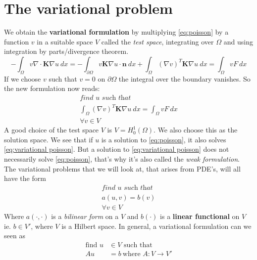 \documentclass[../Main/main.tex]{subfiles}
\begin{document}
	\section*{The variational problem}
	We obtain the \textbf{variational formulation} by multiplying \eqref{eq:poisson} by a function $v$ in a suitable space $V$ called the \emph{test space}, integrating over $\Omega$ and using integration by parts/divergence theorem.
	\begin{equation*}
		-\int_{\Omega}v\nabla \cdot\pmb{K}\nabla u \ dx = -\int_{\partial \Omega}v \pmb{K}\nabla u \cdot \pmb{n} \ dx + \int_{\Omega}(\nabla v)^{T}\pmb{K} \nabla u \ dx = \int_{\Omega}v F \ dx
	\end{equation*}
	If we choose $v$ such that $v=0$ on $\partial \Omega$ the integral over the boundary vanishes. So the new formulation now reads:
	\begin{equation}\label{eq:variational poisson}
		\begin{gathered}
			\textit{find }u \textit{ such that} 						\\ 
			 \int_{\Omega}(\nabla v)^T \pmb{K} \nabla u \ dx = \int_{\Omega}v F \ dx\\ 
			\forall v \in V
		\end{gathered}
	\end{equation}
	A good choice of the test space $V$ is $V=H_0^1(\Omega)$. We also choose this as the solution space.
	We see that if $u$ is a solution to \eqref{eq:poisson}, it also solves \eqref{eq:variational poisson}. But a solution to \eqref{eq:variational poisson} does not necessarily solve \eqref{eq:poisson}, that's why it's also called the \emph{weak formulation}.\\
	The variational problems that we will look at, that arises from PDE's, will all have the form
	\begin{equation}\label{eq:variational problem}
		\begin{gathered}
			\textit{find }u \textit{ such that} 						\\ 
			a(u,v) = b(v)\\ 
			\forall v \in V
		\end{gathered}
	\end{equation}
	Where $a(\cdot,\cdot)$ is a \emph{bilinear form} on a $V$ and $b(\cdot)$ is a \textbf{linear functional} on $V$ ie. $b\in V'$, where $V$ is a Hilbert space. In general, a variational formulation can we seen as 
	\begin{equation}
		\begin{aligned}
			\text{find }u&\in V \text{ such that }\\
			Au&=b \ \text{where }A:V\rightarrow V' 
		\end{aligned}
	\end{equation}
\end{document}
